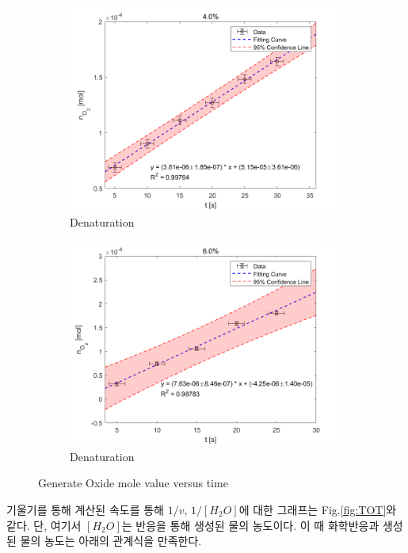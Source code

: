 \documentclass[%
 reprint,
 amsmath,amssymb,
 aps,
]{revtex4-2}
\begin{document}
\begin{figure}[htbp]
	\begin{subfigure}{0.4\textwidth}
		\includegraphics[width = 1\linewidth]{MOL_40.png}%
		\caption{\label{fig:MOL_40}Denaturation}
	\end{subfigure}
	\begin{subfigure}{0.4\textwidth}
		\includegraphics[width = 1\linewidth]{MOL_60.png}%
		\caption{\label{fig:MOL_60}Denaturation}
	\end{subfigure}
	\caption{\label{fig:v_t}Generate Oxide mole value versus time}
\end{figure}

기울기를 통해 계산된 속도를 통해 $1/v$, $1/[H_{2}O]$에 대한 그래프는 Fig.\ref{fig:TOT}와 같다. 단, 여기서 $[H_{2}O]$는 반응을 통해 생성된 물의 농도이다. 이 때 화학반응과 생성된 물의 농도는 아래의 관계식을 만족한다.
\end{document}
